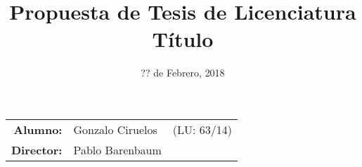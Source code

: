 \documentclass[11pt, a4paper]{article}
\title{Propuesta de Tesis de Licenciatura \\ Título}
\date{?? de Febrero, 2018}
\begin{document}
\maketitle
\begin{large}
\begin{tabular}{r l l}
  \textbf{Alumno:} & Gonzalo Ciruelos  & (LU: 63/14) \\
  \textbf{Director:} & Pablo Barenbaum & \\
\end{tabular}
\end{large}




\end{document}
